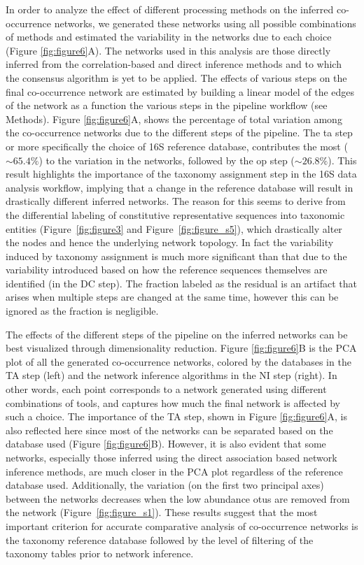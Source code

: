   In order to analyze the effect of different processing methods on the inferred co-occurrence networks, we generated these networks using all possible combinations of methods and estimated the variability in the networks due to each choice (Figure \ref{fig:figure6}A).
  The networks used in this analysis are those directly inferred from the correlation-based and direct inference methods and to which the consensus algorithm is yet to be applied.
  The effects of various steps on the final co-occurrence network are estimated by building a linear model of the edges of the network as a function the various steps in the pipeline workflow (see Methods).
  Figure \ref{fig:figure6}A, shows the percentage of total variation among the co-occurrence networks due to the different steps of the pipeline.
  The \ac{ta} step or more specifically the choice of 16S reference database, contributes the most ($\sim65.4\%$) to the variation in the networks, followed by the \ac{op} step ($\sim26.8\%$).
  This result highlights the importance of the taxonomy assignment step in the 16S data analysis workflow, implying that a change in the reference database will result in drastically different inferred networks.
  The reason for this seems to derive from the differential labeling of constitutive representative sequences into taxonomic entities (Figure~\ref{fig:figure3} and Figure~\ref{fig:figure_s5}), which drastically alter the nodes and hence the underlying network topology.
  In fact the variability induced by taxonomy assignment is much more significant than that due to the variability introduced based on how the reference sequences themselves are identified (in the DC step).
  The fraction labeled as the residual is an artifact that arises when multiple steps are changed at the same time, however this can be ignored as the fraction is negligible.

  The effects of the different steps of the pipeline on the inferred networks can be best visualized through dimensionality reduction.
  Figure \ref{fig:figure6}B is the PCA plot of all the generated co-occurrence networks, colored by the databases in the TA step (left) and the network inference algorithms in the NI step (right).
  In other words, each point corresponds to a network generated using different combinations of tools, and captures how much the final network is affected by such a choice.
  The importance of the TA step, shown in Figure \ref{fig:figure6}A, is also reflected here since most of the networks can be separated based on the database used (Figure \ref{fig:figure6}B).
  However, it is also evident that some networks, especially those inferred using the direct association based network inference methods, are much closer in the PCA plot regardless of the reference database used.
  Additionally, the variation (on the first two principal axes) between the networks decreases when the low abundance \ac{otu}s are removed from the network (Figure~\ref{fig:figure_s1}).
  These results suggest that the most important criterion for accurate comparative analysis of co-occurrence networks is the taxonomy reference database followed by the level of filtering of the taxonomy tables prior to network inference.

